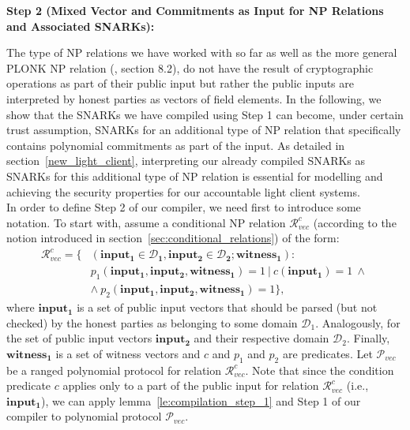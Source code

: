 \noindent \textbf{Step 2 (Mixed Vector and Commitments as Input for NP Relations and Associated SNARKs):} \\
\label{compiler_step_2}

\noindent The type of NP relations we have worked with so far as well as the more general PLONK NP relation 
(\cite{plonk}, section 8.2), do not have the result of cryptographic operations as part of their public input but rather the 
public inputs are interpreted by honest parties as vectors of field elements. In the following, we show that the SNARKs 
we have compiled using Step 1 can become, under certain trust assumption, SNARKs for an additional type of NP relation 
that specifically contains polynomial commitments as part of the input. As detailed in section~\ref{new_light_client}, interpreting 
our already compiled SNARKs as SNARKs for this additional type of NP relation is essential for modelling and achieving 
the security properties for our accountable light client systems.\\ 

\noindent In order to define Step 2 of our compiler, we need first to introduce some notation. 
To start with, assume a conditional NP relation $\mathcal{R}_{\mathit{vec}}^c$ (according to the notion introduced 
in section~\ref{sec:conditional_relations}) of the form:
\begin{align*}
\mathcal{R}_{\mathit{vec}}^c = \{&(\mathbf{input_1} \in \mathbf{\mathcal{D}_1}, \mathbf{input_2} \in\mathbf{\mathcal{D}_2}; \mathbf{witness_1}): \\  
&p_1(\mathbf{input_1}, \mathbf{input_2}, \mathbf{witness_1}) = 1 \ | \ c(\mathbf{input_1}) = 1 \ \wedge\ \\
&\wedge \ p_2(\mathbf{input_1}, \mathbf{input_2}, \mathbf{witness_1}) = 1 \},
\end{align*}
\noindent where $\mathbf{input_1}$ is a set of public input vectors that should be parsed (but not checked) 
by the honest parties as belonging to some domain $\mathcal{D}_1$. Analogously, for the set of public input vectors $\mathbf{input_2}$ and their respective domain 
$\mathcal{D}_2$. Finally, $\mathbf{witness_1}$ is a set of witness vectors and $c$ and $p_1$ and $p_2$ are predicates. 
Let $\mathscr{P}_{\mathit{vec}}$ be a ranged polynomial protocol for relation 
$\mathcal{R}_{\mathit{vec}}^c$. Note that since the condition predicate $c$ applies only to a part of the public input for relation $\mathcal{R}_{\mathit{vec}}^c$ 
(i.e., $\mathbf{input_1}$), we can apply lemma~\ref{le:compilation_step_1} and Step 1 of our compiler to polynomial protocol $\mathscr{P}_{\mathit{vec}}$. \\

